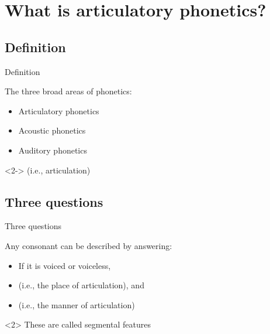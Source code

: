 \documentclass{beamer}
\subtitle[Consonant Articulation]{Articulation of English Consonants}
\newcommand{\suboneone}{Definition}
\newcommand{\subonetwo}{Three questions}
\begin{document}
  

  \section{What is articulatory phonetics?}
    \subsection{\suboneone}
      \begin{frame}{\suboneone}
        \begin{block}{}
          The three broad areas of phonetics:
          \begin{itemize}
            \item \alert<2->{Articulatory phonetics}
            \item Acoustic phonetics
            \item Auditory phonetics
          \end{itemize}
        \end{block}
        \begin{definition}<2->
           (i.e., \alert{articulation})
        \end{definition}
      \end{frame}

    \subsection{\subonetwo}
      \begin{frame}{\subonetwo}
        \begin{block}{}
          Any consonant can be described by answering:
          \begin{itemize}
            \item If it is \alert{voiced} or \alert{voiceless},
            \item  (i.e., the \alert{place of articulation}), and
            \item  (i.e., the \alert{manner of articulation})
          \end{itemize}
        \end{block}
        \begin{alertblock}<2>{}
          These are called \alert{segmental features}
        \end{alertblock}
      \end{frame}
\end{document}
